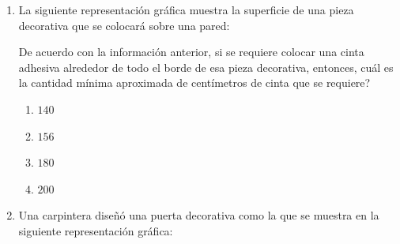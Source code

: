 \documentclass[11pt]{article}
\newcommand{\opcion}[2]{\item $#2$}
\newcommand{\puntografico}{0.09}
\begin{document}
\begin{enumerate}[label=\textbf{\arabic*.}, itemsep=2.5cm]
La medida del lado del dodec\'agono debe ser el doble de la medida del lado del oct\'agono.

Si el per\'imetro de la plazoleta con forma de dodec\'agono debe ser $96\ \text{m}$, entonces, \textquestiondown cu\'al ser\'a el per\'imetro de la plazoleta con forma de oct\'agono?

\begin{enumerate}[label=\Alph*)]
  \opcion{A}{32\ \text{m}}
  \opcion{B}{48\ \text{m}}
  \opcion{C}{64\ \text{m}}
  \opcion{D}{96\ \text{m}}
\end{enumerate}

\Needspace{0.92\textheight}
\item
La siguiente representaci\'on gr\'afica muestra la superficie de una pieza decorativa que se colocar\'a sobre una pared:

\begin{center}

\vspace{0.2cm}

\end{center}

De acuerdo con la informaci\'on anterior, si se requiere colocar una cinta adhesiva alrededor de todo el borde de esa pieza decorativa, entonces, \textquestiondown cu\'al es la cantidad m\'inima aproximada de cent\'imetros de cinta que se requiere?

\begin{enumerate}[label=\Alph*)]
  \opcion{A}{140}
  \opcion{B}{156}
  \opcion{C}{180}
  \opcion{D}{200}
\end{enumerate}

\Needspace{0.88\textheight}
\item
Una carpintera dise\~n\'o una puerta decorativa como la que se muestra en la siguiente representaci\'on gr\'afica:


\end{enumerate}
\end{document}
